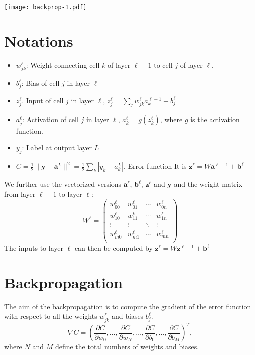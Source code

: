 \documentclass{article}
\newcommand{\vc}[1]{\boldsymbol{#1}}
\begin{document}
    \texttt{[image: backprop-1.pdf]}

    \def\inn{\text{in}}

    \section{Notations}

    \begin{itemize}
        \item $w_{jk}^\ell$: Weight connecting cell $k$ of layer $\ell -1$ to cell $j$ of layer $\ell$. 
        \item $b_j^\ell$: Bias of cell $j$ in layer $\ell$
        \item $z_j^\ell$. Input of cell $j$ in layer $\ell$, $z_j^\ell = \sum_j w_{jk}^\ell a_k^{\ell-1} + b_j^\ell$  
        \item $a_j^\ell$: Activation of cell $j$ in layer $\ell$, $a_k^{\ell} = g(z_k^\ell)$, where $g$ is the activation function.
        \item $y_j$: Label at output layer $L$
        \item $C=\frac12 \| \vc{y} - \vc{a}^L \|^2 = \frac12 \sum_{k} | y_k - a_k^L |$. Error function 
        It is $\vc{z}^{\ell} = W\vc{a}^{\ell-1} + \vc{b}^\ell$
    \end{itemize}

    We further use the vectorized versions $\vc{a}^\ell$, $\vc{b}^\ell$, $\vc{z}^\ell$ and $\vc{y}$ and 
    the weight matrix from layer $\ell-1$ to layer $\ell$:
    \[
    W^\ell = 
    \begin{pmatrix}
        w_{00}^\ell & w_{01}^\ell & \cdots & w_{0n}^\ell \\
        w_{10}^\ell & w_{11}^k & \cdots & w_{1n}^\ell \\
        \vdots   & \vdots & \ddots & \vdots \\
        w_{m0}^\ell & w_{m1}^\ell & \cdots & w_{mn}^\ell \\ 
    \end{pmatrix}
    \]
    The inputs to layer $\ell$ can then be computed by $\vc{z}^\ell = W\vc{z}^{\ell-1}+\vc{b}^\ell$

    \section{Backpropagation}

    The aim of the backpropagation is to compute the gradient of the error function with 
    respect to all the weights $w_{jk}^\ell$ and biases $b_j^\ell$. 
    \[
      \nabla C = 
      \left(\frac{\partial C}{\partial w_0}, 
      \ldots,\frac{\partial C}{\partial w_N}, 
      \ldots,\frac{\partial C}{\partial b_0},
      \ldots,\frac{\partial C}{\partial b_M}
    \right)^T,
    \]
    where $N$ and $M$ define the total numbers of weights and biases.
\end{document}
